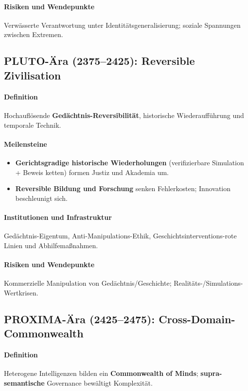 \documentclass[11pt]{article}
\begin{document}
\paragraph{Risiken und Wendepunkte} Verwässerte Verantwortung unter Identitätsgeneralisierung; soziale Spannungen zwischen Extremen.

\subsection{PLUTO-Ära (2375–2425): Reversible Zivilisation}
\paragraph{Definition} Hochauflösende \textbf{Gedächtnis-Reversibilität}, historische Wiederaufführung und temporale Technik.

\paragraph{Meilensteine}
\begin{itemize}[noitemsep]
  \item \textbf{Gerichtsgradige historische Wiederholungen} (verifizierbare Simulation + Beweis ketten) formen Justiz und Akademia um.
  \item \textbf{Reversible Bildung und Forschung} senken Fehlerkosten; Innovation beschleunigt sich.
\end{itemize}

\paragraph{Institutionen und Infrastruktur} Gedächtnis-Eigentum, Anti-Manipulations-Ethik, Geschichtsinterventions-rote Linien und Abhilfemaßnahmen.

\paragraph{Risiken und Wendepunkte} Kommerzielle Manipulation von Gedächtnis/Geschichte; Realitäts-/Simulations-Wertkrisen.

\subsection{PROXIMA-Ära (2425–2475): Cross-Domain-Commonwealth}
\paragraph{Definition} Heterogene Intelligenzen bilden ein \textbf{Commonwealth of Minds}; \textbf{supra-semantische} Governance bewältigt Komplexität.
\end{document}
